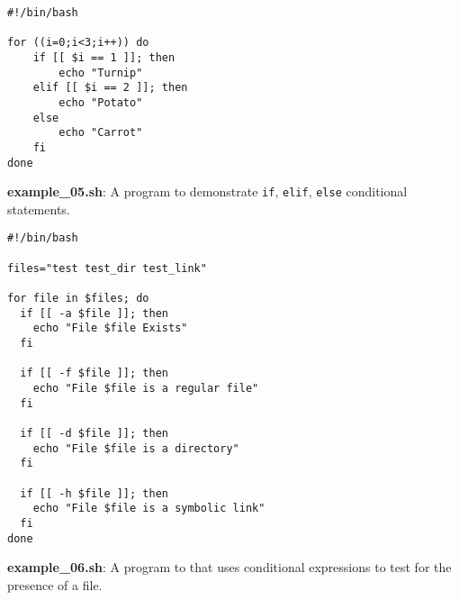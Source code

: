 \documentclass[17pt,dvips]{foils}
\begin{document}

\begin{verbatim}
#!/bin/bash
 
for ((i=0;i<3;i++)) do
    if [[ $i == 1 ]]; then
        echo "Turnip"
    elif [[ $i == 2 ]]; then
        echo "Potato"
    else
        echo "Carrot"
    fi
done
\end{verbatim}
%
{\bf example\_05.sh}: A program to demonstrate \texttt{if}, \texttt{elif}, 
\texttt{else} conditional statements.
%



\begin{verbatim}
#!/bin/bash
 
files="test test_dir test_link"
 
for file in $files; do
  if [[ -a $file ]]; then
    echo "File $file Exists"
  fi
   
  if [[ -f $file ]]; then
    echo "File $file is a regular file"
  fi
   
  if [[ -d $file ]]; then
    echo "File $file is a directory"
  fi
                                                                                
  if [[ -h $file ]]; then
    echo "File $file is a symbolic link"
  fi
done
\end{verbatim}
{\bf example\_06.sh}: A program to that uses conditional expressions to test for
the presence of a file.
\end{document}
